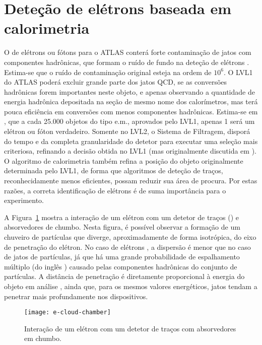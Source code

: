 \section{Deteção de elétrons baseada em calorimetria}
\label{sec:e-detection}

O  de elétrons ou fótons para o ATLAS conterá forte contaminação
de jatos com componentes hadrônicas, que formam o ruído de fundo na deteção de
elétrons \cite{nevski-calor-1992}. Estima-se que o ruído de contaminação
original esteja na ordem de $10^6$. O LVL1 do ATLAS poderá excluir grande
parte dos jatos QCD, se as conversões hadrônicas forem importantes neste
objeto, e apenas observando a quantidade de energia hadrônica depositada na
seção de mesmo nome dos calorímetros, mas terá pouca eficiência em conversões
com menos componentes hadrônicas. Estima-se em
\cite{daqnote00-02}, que a cada 25.000 objetos do tipo e.m., aprovados pelo
LVL1, apenas 1 será um elétron ou fóton verdadeiro. Somente no LVL2, o Sistema
de Filtragem, disporá do tempo e da completa granularidade do detetor para
executar uma seleção mais criteriosa, refinando a decisão obtida no LVL1
\cite{hlt-tdr} (mas originalmente discutida em \cite{ellis-calor-1992}). O
algoritmo de calorimetria também refina a posição do objeto originalmente
determinada pelo LVL1, de forma que algoritmos de deteção de traços,
reconhecidamente menos eficientes, possam reduzir sua área de procura. Por
estas razões, a correta identificação de elétrons é de suma importância para o
experimento.

A Figura~\ref{fig:e-shower} mostra a interação de um elétron com um detetor de
traços () e absorvedores de chumbo. Nesta figura, é
possível observar a formação de um chuveiro de partículas que diverge,
aproximadamente de forma isotrópica, do eixo de penetração do elétron. No caso
de elétrons \cite{wigmans-book}, a dispersão é menor que no caso de jatos de
partículas, já que há uma grande probabilidade de espalhamento múltiplo (do
inglês ) causado pelas componentes hadrônicas do
conjunto de partículas. A distância de penetração é diretamente proporcional à
energia do objeto em análise \cite{leo, knoll}, ainda que, para os mesmos
valores energéticos, jatos tendam a penetrar mais profundamente nos
dispositivos.

\begin{figure}
\begin{center}
\texttt{[image: e-cloud-chamber]}
\end{center}
\caption{Interação de um elétron com um detetor de traços com absorvedores em
chumbo.} 
\label{fig:e-shower}
\end{figure}

